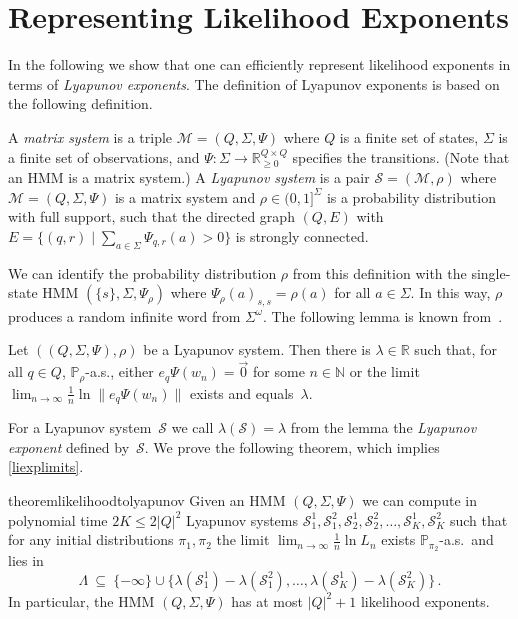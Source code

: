 \documentclass[a4paper,UKenglish,cleveref, autoref,mathscr]{lipics-v2019}
\newcommand{\RR}{\mathbb{R}}
\newcommand{\NN}{\mathbb{N}}
\newcommand{\PP}{\mathbb{P}}
\newcommand{\1}{\mathbbm{1}}
\newcommand{\liexp}{\lim_{n\rightarrow\infty} \frac1n \ln L_n}
\newcommand{\M}{\mathcal{M}}
\renewcommand{\S}{\mathcal{S}}
\begin{document}
\section{Representing Likelihood Exponents} \label{sec:rep}

In the following we show that one can efficiently represent likelihood exponents in terms of \emph{Lyapunov exponents}. 
The definition of Lyapunov exponents is based on the following definition.

\begin{definition} \label{df:lyapunov-exponent}
A \emph{matrix system} is a triple $\M = (Q, \Sigma, \Psi)$ where $Q$ is a finite set of states, $\Sigma$ is a finite set of observations, and $\Psi: \Sigma \to \RR_{\ge 0}^{Q \times Q}$ specifies the transitions.
(Note that an HMM is a matrix system.)
A \emph{Lyapunov system} is a pair $\S = (\M, \rho)$ where $\M = (Q, \Sigma, \Psi)$ is a matrix system and $\rho \in (0,1]^\Sigma$ is a probability distribution with full support, such that the directed graph $(Q,E)$ with $E = \{(q,r) \mid \sum_{a \in \Sigma} \Psi_{q,r}(a) > 0\}$ is strongly connected.
\end{definition}

We can identify the probability distribution $\rho$ from this definition with the single-state HMM $(\{s\}, \Sigma, \Psi_\rho)$ where $\Psi_\rho(a)_{s,s} = \rho(a)$ for all $a \in \Sigma$.
In this way, $\rho$ produces a random infinite word from $\Sigma^\omega$.
The following lemma is known from~\cite{prot13}.

\begin{lemma} \label{lem:lyapunov-exponent}
Let $((Q, \Sigma, \Psi), \rho)$ be a Lyapunov system.
Then there is $\lambda \in \RR$ such that, for all $q \in Q$, $\PP_{\rho}$-a.s., either $e_q \Psi(w_n) = \vec{0}$ for some $n \in \NN$ or the limit $\lim_{n \to \infty} \frac1n \ln \| e_q \Psi(w_n) \|$ exists and equals~$\lambda$.
\end{lemma}
For a Lyapunov system~$\S$ we call $\lambda(\S) = \lambda$ from the lemma the \emph{Lyapunov exponent} defined by~$\S$.
We prove the following theorem, which implies \cref{liexplimits}.
\begin{restatable}{theorem}{likelihoodtolyapunov}\label{thm:likelihood-to-lyapunov}
Given an HMM $(Q, \Sigma, \Psi)$ we can compute in polynomial time $2 K \le 2 |Q|^2$ Lyapunov systems $\S_1^1, \S_1^2, \S_2^1, \S_2^2, \ldots, \S_K^1, \S_K^2$ such that for any initial distributions $\pi_1, \pi_2$ the limit $\liexp$ exists $\PP_{\pi_2}$-a.s.\ and lies in
\[
\Lambda \ \subseteq \ \{-\infty\} \cup \{\lambda(\S_1^1) - \lambda(\S_1^2), \ldots, \lambda(\S_K^1) - \lambda(\S_K^2)\}\,.
\]
In particular, the HMM $(Q, \Sigma, \Psi)$ has at most $|Q|^2 + 1$ likelihood exponents.
\end{restatable}
\end{document}

